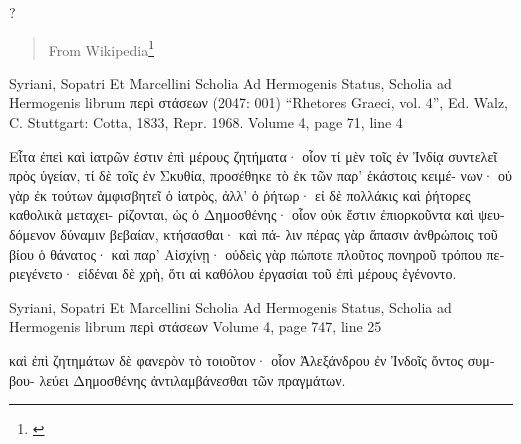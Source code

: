\documentclass[12pt,letterpaper,twoside,final]{memoir}
\begin{document}
?
\blockquote[From Wikipedia\footnote{\url{}}]{}
\begin{greek}

Syriani, Sopatri Et Marcellini Scholia Ad Hermogenis Status, Scholia ad Hermogenis librum περὶ στάσεων (2047: 001)
“Rhetores Graeci, vol. 4”, Ed. Walz, C.
Stuttgart: Cotta, 1833, Repr. 1968.
Volume 4, page 71, line 4

Εἶτα ἐπεὶ καὶ ἰατρῶν ἐστιν ἐπὶ μέρους ζητήματα· οἷον 
τί μὲν τοῖς ἐν Ἰνδίᾳ συντελεῖ πρὸς ὑγείαν, τί δὲ τοῖς 
ἐν Σκυθία, προσέθηκε τὸ ἐκ τῶν παρ' ἑκάστοις κειμέ-
νων· οὐ γὰρ ἐκ τούτων ἀμφισβητεῖ ὁ ἰατρὸς, ἀλλ' ὁ 
ῥήτωρ· εἰ δὲ πολλάκις καὶ ῥήτορες καθολικὰ μεταχει-
ρίζονται, ὡς ὁ Δημοσθένης· οἷον οὐκ ἔστιν ἐπιορκοῦντα 
καὶ ψευδόμενον δύναμιν βεβαίαν, κτήσασθαι· καὶ πά-
λιν πέρας γὰρ ἅπασιν ἀνθρώποις τοῦ βίου ὁ θάνατος· 
καὶ παρ' Αἰσχίνῃ· οὐδεὶς γὰρ πώποτε πλοῦτος πονηροῦ 
τρόπου περιεγένετο· εἰδέναι δὲ χρὴ, ὅτι αἱ καθόλου 
ἐργασίαι τοῦ ἐπὶ μέρους ἐγένοντο. 



Syriani, Sopatri Et Marcellini Scholia Ad Hermogenis Status, Scholia ad Hermogenis librum περὶ στάσεων 
Volume 4, page 747, line 25

                          καὶ ἐπὶ ζητημάτων δὲ φανερὸν 
τὸ τοιοῦτον· οἷον Ἀλεξάνδρου ἐν Ἰνδοῖς ὄντος συμβου-
λεύει Δημοσθένης ἀντιλαμβάνεσθαι τῶν πραγμάτων. 


\end{greek}
\end{document}

